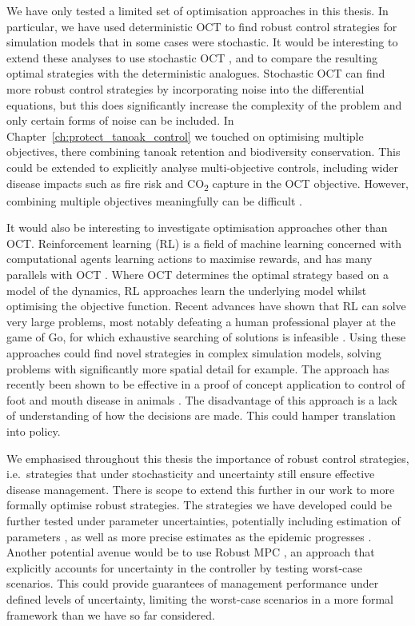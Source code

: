 We have only tested a limited set of optimisation approaches in this thesis. In particular, we have used deterministic OCT to find robust control strategies for simulation models that in some cases were stochastic. It would be interesting to extend these analyses to use stochastic OCT \citep{bertsekas_dynamic_2001}, and to compare the resulting optimal strategies with the deterministic analogues. Stochastic OCT can find more robust control strategies by incorporating noise into the differential equations, but this does significantly increase the complexity of the problem and only certain forms of noise can be included. In Chapter~\ref{ch:protect_tanoak_control} we touched on optimising multiple objectives, there combining tanoak retention and biodiversity conservation. This could be extended to explicitly analyse multi-objective controls, including wider disease impacts such as fire risk and CO\textsubscript{2} capture in the OCT objective. However, combining multiple objectives meaningfully can be difficult \citep{probert_decision_2016}.

It would also be interesting to investigate optimisation approaches other than OCT\@. Reinforcement learning (RL) is a field of machine learning concerned with computational agents learning actions to maximise rewards, and has many parallels with OCT \citep{recht_tour_2019}. Where OCT determines the optimal strategy based on a model of the dynamics, RL approaches learn the underlying model whilst optimising the objective function. Recent advances have shown that RL can solve very large problems, most notably defeating a human professional player at the game of Go, for which exhaustive searching of solutions is infeasible \citep{silver_mastering_2016}. Using these approaches could find novel strategies in complex simulation models, solving problems with significantly more spatial detail for example. The approach has recently been shown to be effective in a proof of concept application to control of foot and mouth disease in animals \citep{probert_context_2019}. The disadvantage of this approach is a lack of understanding of how the decisions are made. This could hamper translation into policy.

We emphasised throughout this thesis the importance of robust control strategies, i.e.\ strategies that under stochasticity and uncertainty still ensure effective disease management. There is scope to extend this further in our work to more formally optimise robust strategies. The strategies we have developed could be further tested under parameter uncertainties, potentially including estimation of parameters \citep{parry_bayesian_2014}, as well as more precise estimates as the epidemic progresses \citep{thompson_control_2018}. Another potential avenue would be to use Robust MPC \citep{bemporad_robust_1999}, an approach that explicitly accounts for uncertainty in the controller by testing worst-case scenarios. This could provide guarantees of management performance under defined levels of uncertainty, limiting the worst-case scenarios in a more formal framework than we have so far considered.

